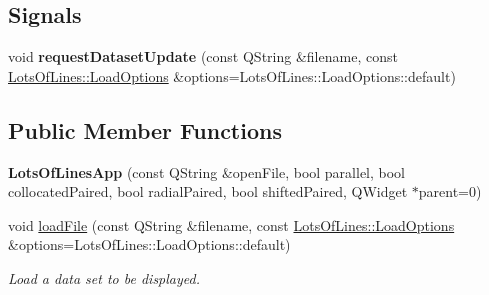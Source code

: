 \subsection*{Signals}
\begin{DoxyCompactItemize}
\item 
void {\bfseries request\+Dataset\+Update} (const Q\+String \&filename, const \hyperlink{struct_lots_of_lines_1_1_load_options}{Lots\+Of\+Lines\+::\+Load\+Options} \&options=Lots\+Of\+Lines\+::\+Load\+Options\+::default)\hypertarget{class_lots_of_lines_app_ac414bca34842822f3cab10f15ab8a526}{}\label{class_lots_of_lines_app_ac414bca34842822f3cab10f15ab8a526}

\end{DoxyCompactItemize}
\subsection*{Public Member Functions}
\begin{DoxyCompactItemize}
\item 
{\bfseries Lots\+Of\+Lines\+App} (const Q\+String \&open\+File, bool parallel, bool collocated\+Paired, bool radial\+Paired, bool shifted\+Paired, Q\+Widget $\ast$parent=0)\hypertarget{class_lots_of_lines_app_a4950a3d973bbcd79151485389a968546}{}\label{class_lots_of_lines_app_a4950a3d973bbcd79151485389a968546}

\item 
void \hyperlink{class_lots_of_lines_app_a1970960805f1670227d0c10bf74c8390}{load\+File} (const Q\+String \&filename, const \hyperlink{struct_lots_of_lines_1_1_load_options}{Lots\+Of\+Lines\+::\+Load\+Options} \&options=Lots\+Of\+Lines\+::\+Load\+Options\+::default)\hypertarget{class_lots_of_lines_app_a1970960805f1670227d0c10bf74c8390}{}\label{class_lots_of_lines_app_a1970960805f1670227d0c10bf74c8390}

\begin{DoxyCompactList}\small\item\em Load a data set to be displayed. \end{DoxyCompactList}\end{DoxyCompactItemize}
